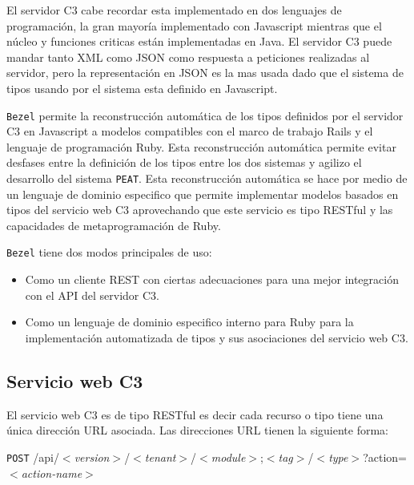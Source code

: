 El servidor C3 cabe recordar esta implementado en dos lenguajes de programación, la
gran mayoría implementado con Javascript mientras que el núcleo y funciones criticas
están implementadas en Java. El servidor C3 puede mandar tanto XML como JSON como
respuesta a peticiones realizadas al servidor, pero la representación en JSON es la
mas usada dado que el sistema de tipos usando por el sistema esta definido en
Javascript.

\texttt{Bezel} permite la reconstrucción automática de los tipos definidos por el
servidor C3 en Javascript a modelos compatibles con el marco de trabajo Rails
y el lenguaje de programación Ruby. Esta reconstrucción automática permite
evitar desfases entre la definición de los tipos entre los dos sistemas y
agilizo el desarrollo del sistema \texttt{PEAT}. Esta reconstrucción automática
se hace por medio de un lenguaje de dominio especifico que permite implementar
modelos basados en tipos del servicio web C3 aprovechando que este servicio
es tipo RESTful y las capacidades de metaprogramación de Ruby.

\texttt{Bezel} tiene dos modos principales de uso:
\begin{itemize}
\item Como un cliente REST con ciertas adecuaciones para una mejor
  integración con el API del servidor C3.
\item Como un lenguaje de dominio especifico interno para Ruby para la
  implementación automatizada de tipos y sus asociaciones del servicio web C3.
\end{itemize}

\subsection{Servicio web C3}

El servicio web C3 es de tipo RESTful es decir cada recurso o tipo tiene una única
dirección URL asociada. Las direcciones URL tienen la siguiente forma:

\vspace{2.5mm}
\texttt{POST} /api/$<$\textit{version}$>$/$<$\textit{tenant}$>$/$<$\textit{module}$>$;$<$\textit{tag}$>$/$<$\textit{type}$>$?action=$<$\textit{action-name}$>$

